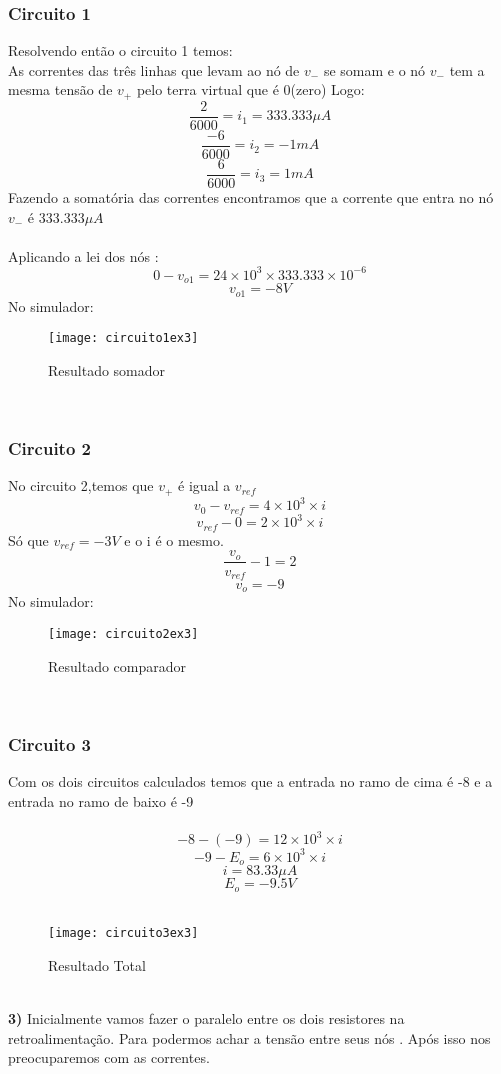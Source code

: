 \documentclass[11pt,a4paper]{article}
\begin{document}
\subsubsection*{Circuito 1}
Resolvendo então o circuito 1 temos:\\
As correntes das três linhas que levam ao nó de $v_-$ se somam e o nó $v_-$ tem a mesma tensão de $v_+$ pelo terra virtual que é 0(zero) Logo:\\
$$\frac{2}{6000}=i_1=333.333 \mu A$$
$$\frac{-6}{6000}=i_2=-1 mA$$
$$\frac{6}{6000}=i_3=1mA $$
Fazendo a somatória das correntes encontramos que a corrente que entra no nó $v_-$ é $333.333 \mu A$\\\\
Aplicando a lei dos nós :\\
$$0-v_{o1}=24\times 10^3 \times 333.333\times 10^{-6} $$
$$v_{o1}=-8 V$$
No simulador:\\
\begin{figure}[!h]
\begin{center}
\texttt{[image: circuito1ex3]}
\caption{Resultado somador}
\end{center}
\end{figure}
\\
\subsubsection*{Circuito 2}
No circuito 2,temos que $v_+$ é igual a $v_{ref}$
$$v_0-v_{ref}=4\times 10^3 \times i$$
$$v_{ref}-0=2\times 10^3 \times i$$
Só que $v_{ref}=-3 V$ e o i é o mesmo.\\
$$\frac{v_o}{v_{ref}}-1=2$$
$$v_o=-9$$
No simulador:\\
\begin{figure}[!h]
\begin{center}
\texttt{[image: circuito2ex3]}
\caption{Resultado comparador}
\end{center}
\end{figure}
\\

\subsubsection*{Circuito 3}
Com os dois circuitos calculados temos que a entrada no ramo de cima é -8 e a entrada no ramo de baixo é -9\\\\

$$-8-(-9)=12\times10^3 \times i$$
$$-9-E_o=6\times10^3 \times i$$
$$i=83.33 \mu A$$
$$E_o=-9.5 V$$\\
\begin{figure}[!h]
\begin{center}
\texttt{[image: circuito3ex3]}
\caption{Resultado Total}
\end{center}
\end{figure}
\\
\newpage
\textbf{3) }
Inicialmente vamos fazer o paralelo entre os dois resistores na retroalimentação. Para podermos achar a tensão entre seus nós . Após isso nos preocuparemos com as correntes.\\
\end{document}
